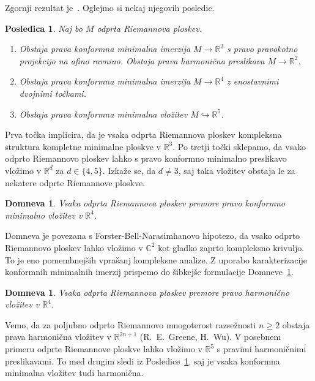 \documentclass[12pt,a4paper,twoside]{article}
\theoremstyle{definition} %
\theoremstyle{plain} %
\newtheorem{posledica}[definicija]{Posledica}
\newtheorem{domneva}[definicija]{Domneva}
\numberwithin{equation}{section}  %
\newcommand{\R}{\mathbb R}
\newcommand{\C}{\mathbb C}
\begin{document}
Zgornji rezultat je~\cite[Theorem~3.10.1]{alarcon2021minimal}. Oglejmo si nekaj njegovih posledic.

\begin{posledica} \label{pos:pravost}
Naj bo $M$ odprta Riemannova ploskev.
\begin{enumerate}
\item Obstaja prava konformna minimalna imerzija $M \to \R^3$ s pravo pravokotno projekcijo na afino ravnino. Obstaja prava harmonična preslikava $M \to \R^2$.
\item Obstaja prava konformna minimalna imerzija $M \to \R^4$ z enostavnimi dvojnimi točkami.
\item Obstaja prava konformna minimalna vložitev $M \hookrightarrow \R^5$.
\end{enumerate}
\end{posledica}

Prva točka implicira, da je vsaka odprta Riemannova ploskev kompleksna struktura kompletne minimalne ploskve v $\R^3$. \newline
Po tretji točki sklepamo, da vsako odprto Riemannovo ploskev lahko s pravo konformno minimalno preslikavo vložimo v $\R^{d}$ za $d \in \{4,5\}$. Izkaže se, da $d \neq 3$, saj taka vložitev obstaja le za nekatere odprte Riemannove ploskve.

\begin{domneva} \label{dom:prava-vložitev}
Vsaka odprta Riemannova ploskev premore pravo konformno minimalno vložitev v $\R^4$.
\end{domneva}

Domneva je povezana s Forster-Bell-Narasimhanovo hipotezo, da vsako odprto Riemannovo ploskev lahko vložimo v $\C^2$ kot gladko zaprto kompleksno krivuljo. To je eno pomembnejših vprašanj kompleksne analize. Z uporabo karakterizacije konformnih minimalnih imerzij prispemo do šibkejše formulacije Domneve~\ref{dom:prava-vložitev}.

\begin{domneva}
Vsaka odprta Riemannova ploskev premore pravo harmonično vložitev v $\R^4$.
\end{domneva}

Vemo, da za poljubno odprto Riemannovo mnogoterost razsežnosti $n \geq 2$ obstaja prava harmonična vložitev v $\R^{2n+1}$ (R.~E.~Greene, H.~Wu). V posebnem primeru odprte Riemannove ploskve lahko vložimo v $\R^5$ s pravimi harmoničnimi preslikavami. To med drugim sledi iz Posledice~\ref{pos:pravost}, saj je vsaka konformna minimalna vložitev tudi harmonična.
\end{document}
